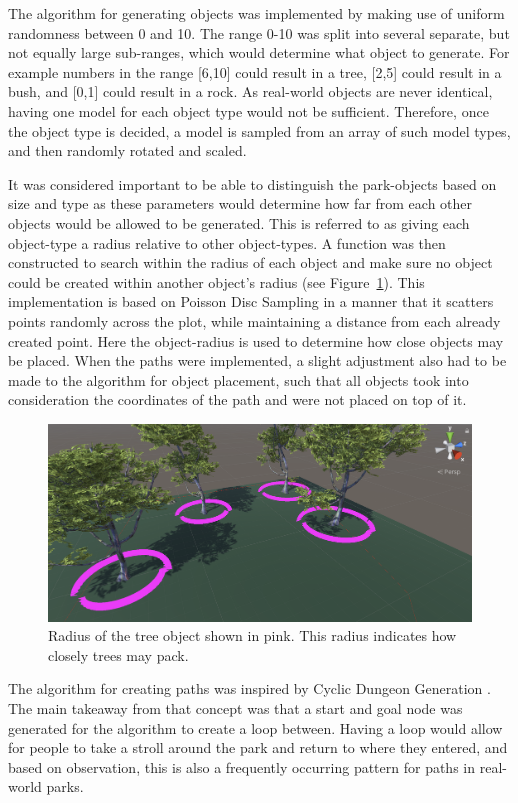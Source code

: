 The algorithm for generating objects was implemented by making use of uniform randomness between 0 and 10.
The range 0-10 was split into several separate, but not equally large sub-ranges, which would determine what object to generate.
For example numbers in the range [6,10] could result in a tree, [2,5] could result in a bush, and [0,1] could result in a rock.
As real-world objects are never identical, having one model for each object type would not be sufficient. 
Therefore, once the object type is decided, a model is sampled from an array of such model types, and then randomly rotated and scaled. 

It was considered important to be able to distinguish the park-objects based on size and type as these parameters would determine how far from each other objects would be allowed to be generated.
This is referred to as giving each object-type a radius relative to other object-types.
A function was then constructed to search within the radius of each object and make sure no object could be created within another object's radius (see Figure~\ref{fig:radius}).
This implementation is based on Poisson Disc Sampling \cite{poisson_fast} in a manner that it scatters points randomly across the plot, while maintaining a distance from each already created point.
Here the object-radius is used to determine how close objects may be placed. 
When the paths were implemented, a slight adjustment also had to be made to the algorithm for object placement, such that all objects took into consideration the coordinates of the path and were not placed on top of it.
\begin{figure}[H]
  \centering
  \includegraphics[width=\linewidth]{figure/radiuscontrol.png}
  \caption{Radius of the tree object shown in pink. This radius indicates how closely trees may pack.}
  \label{fig:radius}
\end{figure}

The algorithm for creating paths was inspired by Cyclic Dungeon Generation \cite{cyclic}.
The main takeaway from that concept was that a start and goal node was generated for the algorithm to create a loop between.
Having a loop would allow for people to take a stroll around the park and return to where they entered, and based on observation, this is also a frequently occurring pattern for paths in real-world parks. 


